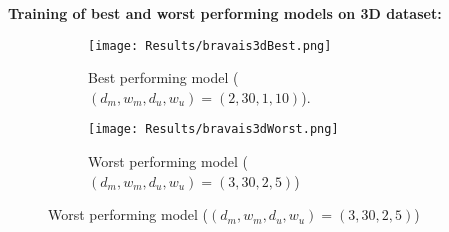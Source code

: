 \textbf{Training of best and worst performing models on 3D dataset:}
\begin{figure}
    \centering
    \begin{subfigure}[t]{0.49\textwidth}
        \centering
        \texttt{[image: Results/bravais3dBest.png]}
        \caption{Best performing model ($(d_m,w_m,d_u,w_u)=(2, 30, 1, 10)$).}
    \end{subfigure}
    \hfill
    \begin{subfigure}[t]{0.49\textwidth}
        \centering
        \texttt{[image: Results/bravais3dWorst.png]}
        \caption{Worst performing model ($(d_m,w_m,d_u,w_u)=(3, 30, 2, 5)$)}
    \end{subfigure}   
\end{figure}